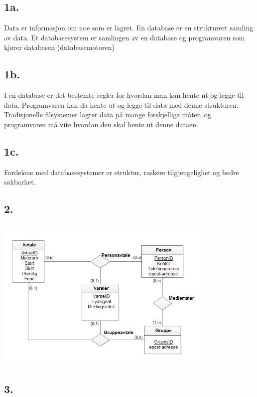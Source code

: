\documentclass[a4paper]{article}
\date{}
\begin{document}
\thispagestyle{fancy}

\subsection*{1a.}

Data er informasjon om noe som er lagret. En database er en strukturert samling av data. Et databasesystem er samlingen av en database og programvaren som kjører databasen (databasemotoren)

\subsection*{1b.}

I en database er det bestemte regler for hvordan man kan hente ut og legge til data. Programvaren kan da hente ut og legge til data med denne strukturen. Tradisjonelle filsystemer lagrer data på mange forskjellige måter, og programvaren må vite hvordan den skal hente ut denne dataen.


\subsection*{1c.}

Fordelene med databasesystemer er struktur, raskere tilgjengelighet og bedre søkbarhet.

\subsection*{2.}

\noindent
\begin{center}
\includegraphics[width=0.8\textwidth]{oving1-2.png}
\par\end{center}

\subsection*{3.}
\end{document}
